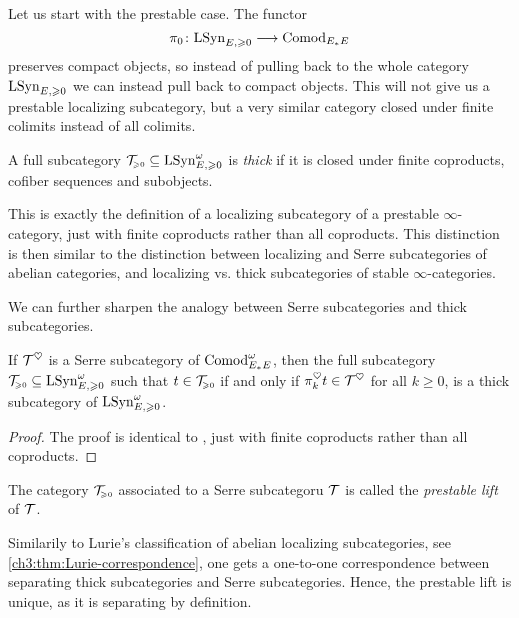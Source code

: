 Let us start with the prestable case. The functor 
\[\pi_0 \colon \mathrm{LSyn}_{E, \geqslant 0} \longrightarrow \mathrm{Comod}_{E_*E}\]
preserves compact objects, so instead of pulling back to the whole category $\mathrm{LSyn}_{E, \geqslant 0}$ we can instead pull back to compact objects. This will not give us a prestable localizing subcategory, but a very similar category closed under finite colimits instead of all colimits. 

\begin{definition}
    A full subcategory $\mathcal{T}_{\hspace{-1pt}\scriptscriptstyle\geqslant 0} \subseteq \mathrm{LSyn}_{E, \geqslant 0}^\omega$ is \emph{thick} if it is closed under finite coproducts, cofiber sequences and subobjects. 
\end{definition}

\begin{remark}
    This is exactly the definition of a localizing subcategory of a prestable $\infty$-category, just with finite coproducts rather than all coproducts. This distinction is then similar to the distinction between localizing and Serre subcategories of abelian categories, and localizing vs. thick subcategories of stable $\infty$-categories. 
\end{remark}

We can further sharpen the analogy between Serre subcategories and thick subcategories. 

\begin{lemma}
    If $\mathcal{T}^\heartsuit$ is a Serre subcategory of $\mathrm{Comod}_{E_*E}^\omega$, then the full subcategory $\mathcal{T}_{\hspace{-1pt}\scriptscriptstyle\geqslant 0}\subseteq \mathrm{LSyn}_{E, \geqslant 0}^\omega$ such that $t\in \mathcal{T}_{\hspace{-1pt}\scriptscriptstyle\geqslant 0}$ if and only if $\pi^\heartsuit_k t \in \mathcal{T}^\heartsuit$ for all $k\geq 0$, is a thick subcategory of $\mathrm{LSyn}_{E, \geqslant 0}^\omega$. 
\end{lemma}
\begin{proof}
    The proof is identical to \cite[C.5.2.7]{lurie_SAG}, just with finite coproducts rather than all coproducts. 
\end{proof}

\begin{definition}
    The category $\mathcal{T}_{\hspace{-1pt}\scriptscriptstyle\geqslant 0}$ associated to a Serre subcategoru $\mathcal{T}$ is called the \emph{prestable lift} of $\mathcal{T}$. 
\end{definition}

\begin{definition}
    Similarily to Lurie's classification of abelian localizing subcategories, see \cref{ch3:thm:Lurie-correspondence}, one gets a one-to-one correspondence between separating thick subcategories and Serre subcategories. Hence, the prestable lift is unique, as it is separating by definition. 
\end{definition}

